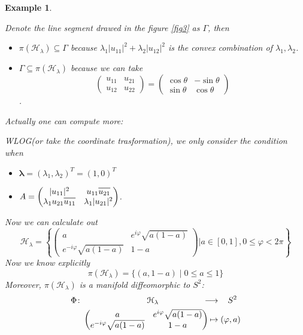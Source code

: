 \documentclass[11pt]{amsart}
\numberwithin{equation}{section}
\theoremstyle{plain}
\newtheorem{eg}[theorem]{Example}
\theoremstyle{plain}
\numberwithin{equation}{section}
\theoremstyle{remark}
\newcommand*\widebar[1]{%
	\hbox{%
		\vbox{%
			\hrule height 0.5pt %
			\kern0.6ex%
			\hbox{%
				\kern 0em%
				\ensuremath{#1}%
				\kern 0em%
			}%
		}%
	}%
}
\begin{document}
\begin{eg}
\begin{figure}[th]
\begin{minipage}[t]{.49\textwidth}
		\caption{}
		\label{fig4}
	\end{minipage}
\end{figure}	
Denote the line segment drawed in the figure \ref{fig3} as $\Gamma$, then
\begin{itemize}
	\item $\pi (\mathcal{H}_\lambda) \subseteq \Gamma$ because 
	$\lambda_1|u_{11}|^2+\lambda_2 |u_{12}|^2$ is the convex combination of $\lambda_1, \lambda_2$.
	\item $\Gamma \subseteq \pi (\mathcal{H}_\lambda)$ because we can take
	$$\begin{pmatrix}
	 u_{11} &  u_{21} \\
	 u_{12} &  u_{22}
	\end{pmatrix}=
	\begin{pmatrix}
	\cos \theta & -\sin \theta \\
	\sin \theta & \cos \theta
	\end{pmatrix}$$.
\end{itemize}

	 Actually one can compute more:
	 
	WLOG(or take the coordinate trasformation), we only consider the condition when 
\begin{itemize}
	\item $\bm{\lambda} =(\lambda_1,\lambda_2)^T=(1,0)^T$ 
	\item 
	$A=\begin{pmatrix}
	|u_{11}|^2 & u_{11} \widebar{u_{21}} \\
	\lambda_1 u_{21} \widebar{u_{11}} & \lambda_1|u_{21}|^2
	\end{pmatrix}$.
\end{itemize}	
Now we can calculate out
$$\mathcal{H}_\lambda = \left\{ 
	\begin{pmatrix}
	a & e^{i\varphi} \sqrt{a(1-a)} \\
	e^{-i\varphi} \sqrt{a(1-a)} & 1-a
	\end{pmatrix} \bigg|a \in [0,1], 0 \leqslant \varphi <2\pi
	\right\} $$
Now we know explicitly
$$\pi (\mathcal{H}_\lambda)=\{(a,1-a) \mid 0\leqslant a \leqslant 1\}$$
Moreover, $\pi (\mathcal{H}_\lambda)$ is a manifold diffeomorphic to $S^2$:
\begin{equation*}
\begin{aligned}	
\Phi \colon &\hspace{2.7cm} \mathcal{H}_\lambda &\longrightarrow &\hspace{.4cm}  S^2 \\
&\begin{pmatrix}
a & e^{i\varphi} \sqrt{a(1-a)} \\
e^{-i\varphi} \sqrt{a(1-a)} & 1-a
\end{pmatrix}\hspace{-0.5cm} &\mapsto &\;(\varphi , a)
\end{aligned}
\end{equation*}

\end{eg}
\end{document}
